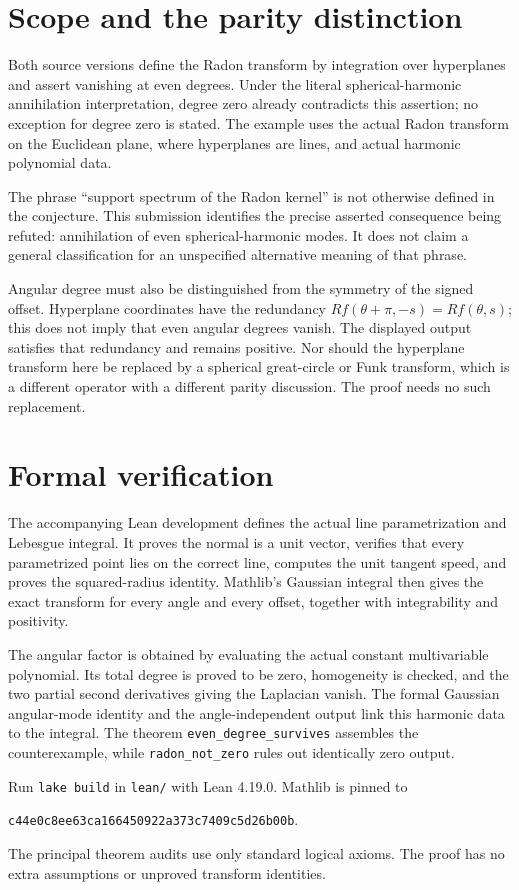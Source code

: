 \documentclass[11pt]{article}
\begin{document}
\section*{Scope and the parity distinction}
Both source versions define the Radon transform by integration over hyperplanes and assert vanishing at even degrees. Under the literal spherical-harmonic annihilation interpretation, degree zero already contradicts this assertion; no exception for degree zero is stated. The example uses the actual Radon transform on the Euclidean plane, where hyperplanes are lines, and actual harmonic polynomial data.

The phrase ``support spectrum of the Radon kernel'' is not otherwise defined in the conjecture. This submission identifies the precise asserted consequence being refuted: annihilation of even spherical-harmonic modes. It does not claim a general classification for an unspecified alternative meaning of that phrase.

Angular degree must also be distinguished from the symmetry of the signed offset. Hyperplane coordinates have the redundancy
$R f(\theta+\pi,-s)=Rf(\theta,s)$; this does not imply that even angular degrees vanish. The displayed output satisfies that redundancy and remains positive. Nor should the hyperplane transform here be replaced by a spherical great-circle or Funk transform, which is a different operator with a different parity discussion. The proof needs no such replacement.

\section*{Formal verification}
The accompanying Lean development defines the actual line parametrization and Lebesgue integral. It proves the normal is a unit vector, verifies that every parametrized point lies on the correct line, computes the unit tangent speed, and proves the squared-radius identity. Mathlib's Gaussian integral then gives the exact transform for every angle and every offset, together with integrability and positivity.

The angular factor is obtained by evaluating the actual constant multivariable polynomial. Its total degree is proved to be zero, homogeneity is checked, and the two partial second derivatives giving the Laplacian vanish. The formal Gaussian angular-mode identity and the angle-independent output link this harmonic data to the integral. The theorem \texttt{even\_degree\_survives} assembles the counterexample, while \texttt{radon\_not\_zero} rules out identically zero output.

Run \texttt{lake build} in \texttt{lean/} with Lean 4.19.0. Mathlib is pinned to
\begin{center}\small\texttt{c44e0c8ee63ca166450922a373c7409c5d26b00b}.\end{center}
The principal theorem audits use only standard logical axioms. The proof has no extra assumptions or unproved transform identities.
\end{document}
